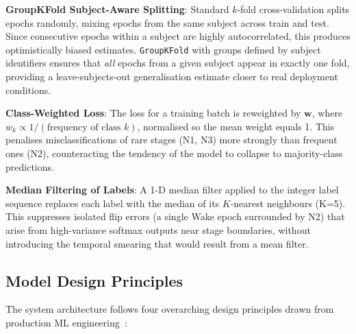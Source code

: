 \documentclass[10pt]{article}
\begin{document}
\textbf{GroupKFold Subject-Aware Splitting}: Standard $k$-fold cross-validation splits epochs randomly, mixing epochs from the same subject across train and test. Since consecutive epochs within a subject are highly autocorrelated, this produces optimistically biased estimates. \texttt{GroupKFold} with groups defined by subject identifiers ensures that \textit{all} epochs from a given subject appear in exactly one fold, providing a leave-subjects-out generalisation estimate closer to real deployment conditions.

\textbf{Class-Weighted Loss}: The loss for a training batch is reweighted by $\mathbf{w}$, where $w_k \propto 1/(\text{frequency of class } k)$, normalised so the mean weight equals 1. This penalises misclassifications of rare stages (N1, N3) more strongly than frequent ones (N2), counteracting the tendency of the model to collapse to majority-class predictions.

\textbf{Median Filtering of Labels}: A 1-D median filter applied to the integer label sequence replaces each label with the median of its $K$-nearest neighbours (K=5). This suppresses isolated flip errors (a single Wake epoch surrounded by N2) that arise from high-variance softmax outputs near stage boundaries, without introducing the temporal smearing that would result from a mean filter.

\subsection{Model Design Principles}
\label{sec:modelPrinciples}

The system architecture follows four overarching design principles drawn from production ML engineering~\cite{sculley2015hidden}:
\end{document}
